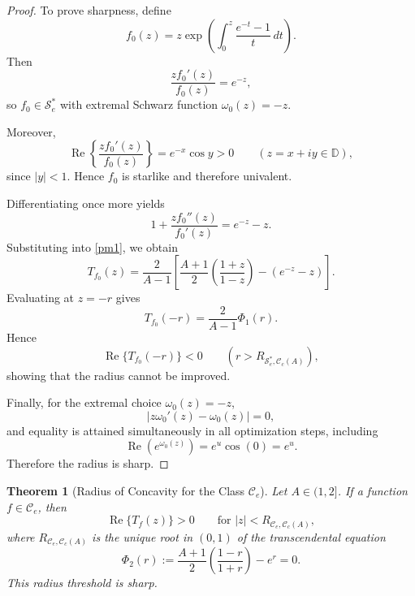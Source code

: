\documentclass[12pt]{article}
\newtheorem{theorem}{Theorem}[section]
\renewcommand{\Re}{\operatorname{Re}}
\begin{document}
\begin{proof}
To prove sharpness, define
\begin{equation}\label{eq:extremal_f0}
f_0(z)
=
z\exp\left(
\int_0^z
\frac{e^{-t}-1}{t}\,dt
\right).
\end{equation}
Then
\[
\frac{zf_0'(z)}{f_0(z)}
=
e^{-z},
\]
so $f_0\in\mathcal S_e^*$ with extremal Schwarz function $\omega_0(z)=-z$.

Moreover,
\[
\Re\left\{
\frac{zf_0'(z)}{f_0(z)}
\right\}
=
e^{-x}\cos y>0
\qquad
(z=x+iy\in\mathbb D),
\]
since $|y|<1$. Hence $f_0$ is starlike and therefore univalent.

Differentiating once more yields
\[
1+\frac{zf_0''(z)}{f_0'(z)}
=
e^{-z}-z.
\]
Substituting into \eqref{pm1}, we obtain
\[
T_{f_0}(z)
=
\frac{2}{A-1}
\left[
\frac{A+1}{2}\left(\frac{1+z}{1-z}\right)
-
(e^{-z}-z)
\right].
\]
Evaluating at $z=-r$ gives
\[
T_{f_0}(-r)
=
\frac{2}{A-1}\Phi_1(r).
\]
Hence
\[
\Re\{T_{f_0}(-r)\}<0
\qquad
(r>R_{\mathcal S_e^*,\mathcal C_c(A)}),
\]
showing that the radius cannot be improved.

Finally, for the extremal choice $\omega_0(z)=-z$,
\[
|z\omega_0'(z)-\omega_0(z)|=0,
\]
and equality is attained simultaneously in all optimization steps, including
\[
\Re(e^{\omega_0(z)})
=
e^u\cos(0)
=
e^u.
\]
Therefore the radius is sharp.
\end{proof}


\begin{theorem}[Radius of Concavity for the Class $\mathcal{C}_e$]
\label{T2}
Let $A\in(1,2]$. If a function $f\in\mathcal{C}_e$, then
\begin{equation}\label{eq:convex_operator_ineq}
\Re\{T_f(z)\}>0 \qquad \text{for } |z|<R_{\mathcal{C}_e,\mathcal{C}_c(A)},
\end{equation}
where $R_{\mathcal{C}_e,\mathcal{C}_c(A)}$ is the unique root in $(0,1)$ of the transcendental equation
\begin{equation}\label{pm15}
\Phi_2(r) := \frac{A+1}{2} \left( \frac{1-r}{1+r} \right) - e^r = 0.
\end{equation}
This radius threshold is sharp.
\end{theorem}
\end{document}

